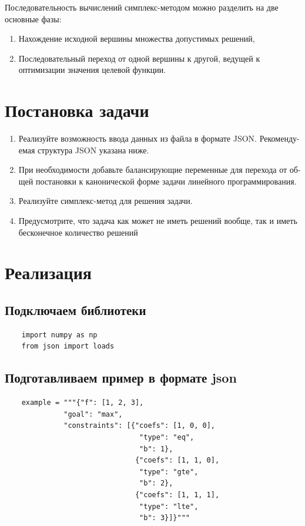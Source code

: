 \documentclass{article}
\begin{document}
Последовательность вычислений симплекс-методом можно разделить на две основные фазы:

\begin{enumerate}
    \item Нахождение исходной вершины множества допустимых решений,
    \item Последовательный переход от одной вершины к другой, ведущей к оптимизации значения целевой функции.
\end{enumerate}

\section{Постановка задачи}
\begin{enumerate}
    \item Реализуйте возможность ввода данных из файла в формате JSON. Рекоменду-
          емая структура JSON указана ниже.
    \item При необходимости добавьте балансирующие переменные для перехода от об-
          щей постановки к канонической форме задачи линейного программирования.
    \item Реализуйте симплекс-метод для решения задачи.
    \item Предусмотрите, что задача как может не иметь решений вообще, так и иметь
          бесконечное количество решений
\end{enumerate}

\section{Реализация}

\subsection{Подключаем библиотеки}

\begin{listing}[H]
    \begin{verbatim}
    import numpy as np
    from json import loads
    \end{verbatim}
\end{listing}

\subsection{Подготавливаем пример в формате json}
\begin{listing}[H]
    \begin{verbatim}
    example = """{"f": [1, 2, 3],
              "goal": "max",
              "constraints": [{"coefs": [1, 0, 0],
                                "type": "eq",
                                "b": 1},
                               {"coefs": [1, 1, 0],
                                "type": "gte",
                                "b": 2},
                               {"coefs": [1, 1, 1],
                                "type": "lte",
                                "b": 3}]}"""
    \end{verbatim}
\end{listing}
\end{document}
